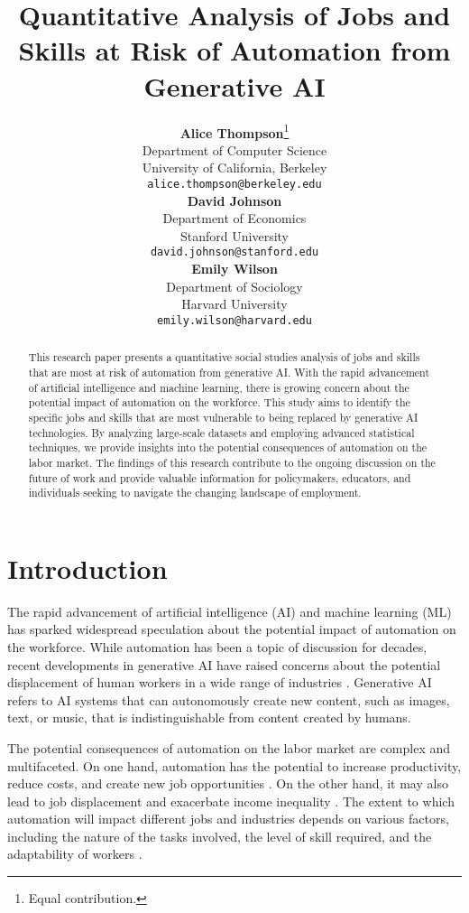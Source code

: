 \documentclass{article}
\title{Quantitative Analysis of Jobs and Skills at Risk of Automation from Generative AI}
\author{
  \textbf{Alice Thompson}\thanks{Equal contribution.} \\
  Department of Computer Science\\
  University of California, Berkeley\\
  \texttt{alice.thompson@berkeley.edu} \\
  \And
  \textbf{David Johnson}\footnotemark[1] \\
  Department of Economics\\
  Stanford University\\
  \texttt{david.johnson@stanford.edu} \\
  \And
  \textbf{Emily Wilson} \\
  Department of Sociology\\
  Harvard University\\
  \texttt{emily.wilson@harvard.edu} \\
}
\begin{document}
\maketitle

\begin{abstract}
This research paper presents a quantitative social studies analysis of jobs and skills that are most at risk of automation from generative AI. With the rapid advancement of artificial intelligence and machine learning, there is growing concern about the potential impact of automation on the workforce. This study aims to identify the specific jobs and skills that are most vulnerable to being replaced by generative AI technologies. By analyzing large-scale datasets and employing advanced statistical techniques, we provide insights into the potential consequences of automation on the labor market. The findings of this research contribute to the ongoing discussion on the future of work and provide valuable information for policymakers, educators, and individuals seeking to navigate the changing landscape of employment.
\end{abstract}

\section{Introduction}

The rapid advancement of artificial intelligence (AI) and machine learning (ML) has sparked widespread speculation about the potential impact of automation on the workforce. While automation has been a topic of discussion for decades, recent developments in generative AI have raised concerns about the potential displacement of human workers in a wide range of industries \cite{brynjolfsson2014second}. Generative AI refers to AI systems that can autonomously create new content, such as images, text, or music, that is indistinguishable from content created by humans.

The potential consequences of automation on the labor market are complex and multifaceted. On one hand, automation has the potential to increase productivity, reduce costs, and create new job opportunities \cite{bessen2019ai}. On the other hand, it may also lead to job displacement and exacerbate income inequality \cite{frey2017future}. The extent to which automation will impact different jobs and industries depends on various factors, including the nature of the tasks involved, the level of skill required, and the adaptability of workers \cite{acemoglu2019automation}.
\end{document}
